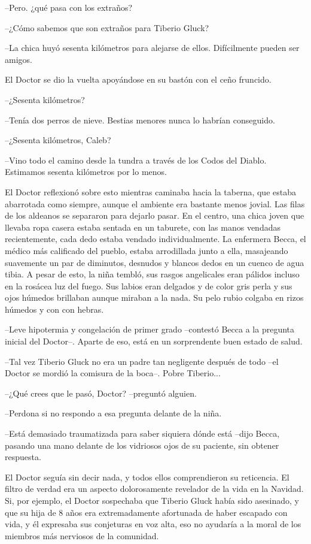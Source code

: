 --Pero. ¿qué pasa con los extraños?
 
--¿Cómo sabemos que son extraños para Tiberio Gluck?
 
--La chica huyó sesenta kilómetros para alejarse de ellos. Difícilmente pueden ser amigos.
 
El Doctor se dio la vuelta apoyándose en su bastón con el ceño fruncido.
 
--¿Sesenta kilómetros?
 
--Tenía dos perros de nieve. Bestias menores nunca lo habrían conseguido.
 
--¿Sesenta kilómetros, Caleb?
 
--Vino todo el camino desde la tundra a través de los Codos del Diablo. Estimamos sesenta kilómetros por lo menos.
 
El Doctor reflexionó sobre esto mientras caminaba hacia la taberna, que estaba abarrotada como siempre, aunque el ambiente era bastante menos jovial. Las filas de los aldeanos se separaron para dejarlo pasar. En el centro, una chica joven que llevaba ropa casera estaba sentada en un taburete, con las manos vendadas recientemente, cada dedo estaba vendado individualmente. La enfermera Becca, el médico más calificado del pueblo, estaba arrodillada junto a ella, masajeando suavemente un par de diminutos, desnudos y blancos dedos en un cuenco de agua tibia. A pesar de esto, la niña tembló, sus rasgos angelicales eran pálidos incluso en la rosácea luz del fuego. Sus labios eran delgados y de color gris perla y sus ojos húmedos brillaban aunque miraban a la nada. Su pelo rubio colgaba en rizos húmedos y con con hebras.
 
--Leve hipotermia y congelación de primer grado --contestó Becca a la pregunta inicial del Doctor--. Aparte de eso, está en un sorprendente buen estado de salud.
 
--Tal vez Tiberio Gluck no era un padre tan negligente después de todo --el Doctor se mordió la comisura de la boca--. Pobre Tiberio...
 
--¿Qué crees que le pasó, Doctor? --preguntó alguien.
 
--Perdona si no respondo a esa pregunta delante de la niña.
 
--Está demasiado traumatizada para saber siquiera dónde está --dijo Becca, pasando una mano delante de los vidriosos ojos de su paciente, sin obtener respuesta.
 
El Doctor seguía sin decir nada, y todos ellos comprendieron su reticencia. El filtro de verdad era un aspecto dolorosamente revelador de la vida en la Navidad. Si, por ejemplo, el Doctor sospechaba que Tiberio Gluck había sido asesinado, y que su hija de 8 años era extremadamente afortunada de haber escapado con vida, y él expresaba sus conjeturas en voz alta, eso no ayudaría a la moral de los miembros más nerviosos de la comunidad.
 
